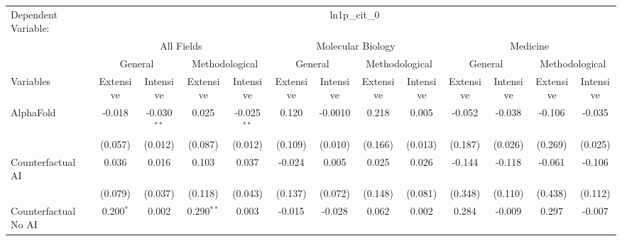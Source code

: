 \begingroup
\centering
\begin{tabular}{lcccccccccccc}
   \tabularnewline \midrule \midrule
   Dependent Variable: & \multicolumn{12}{c}{ln1p\_cit\_0}\\
 & \multicolumn{4}{c}{All Fields} & \multicolumn{4}{c}{Molecular Biology} & \multicolumn{4}{c}{Medicine} \\
\cmidrule(lr){2-5} \cmidrule(lr){6-9} \cmidrule(lr){10-13}
 & \multicolumn{2}{c}{General} & \multicolumn{2}{c}{Methodological} & \multicolumn{2}{c}{General} & \multicolumn{2}{c}{Methodological} & \multicolumn{2}{c}{General} & \multicolumn{2}{c}{Methodological} \\
\cmidrule(lr){2-3} \cmidrule(lr){4-5} \cmidrule(lr){6-7} \cmidrule(lr){8-9} \cmidrule(lr){10-11} \cmidrule(lr){12-13}
Variables & \multicolumn{1}{c}{Extensive} & \multicolumn{1}{c}{Intensive} & \multicolumn{1}{c}{Extensive} & \multicolumn{1}{c}{Intensive} & \multicolumn{1}{c}{Extensive} & \multicolumn{1}{c}{Intensive} & \multicolumn{1}{c}{Extensive} & \multicolumn{1}{c}{Intensive} & \multicolumn{1}{c}{Extensive} & \multicolumn{1}{c}{Intensive} & \multicolumn{1}{c}{Extensive} & \multicolumn{1}{c}{Intensive} \\
\cmidrule(lr){1-1}\cmidrule(lr){2-2} \cmidrule(lr){3-3} \cmidrule(lr){4-4} \cmidrule(lr){5-5} \cmidrule(lr){6-6} \cmidrule(lr){7-7} \cmidrule(lr){8-8} \cmidrule(lr){9-9} \cmidrule(lr){10-10} \cmidrule(lr){11-11} \cmidrule(lr){12-12} \cmidrule(lr){13-13}
   AlphaFold                                & -0.018       & -0.030$^{**}$ & 0.025        & -0.025$^{**}$ & 0.120   & -0.0010 & 0.218   & 0.005   & -0.052  & -0.038      & -0.106  & -0.035\\   
                                            & (0.057)      & (0.012)       & (0.087)      & (0.012)       & (0.109) & (0.010) & (0.166) & (0.013) & (0.187) & (0.026)     & (0.269) & (0.025)\\   
   Counterfactual AI                        & 0.036        & 0.016         & 0.103        & 0.037         & -0.024  & 0.005   & 0.025   & 0.026   & -0.144  & -0.118      & -0.061  & -0.106\\   
                                            & (0.079)      & (0.037)       & (0.118)      & (0.043)       & (0.137) & (0.072) & (0.148) & (0.081) & (0.348) & (0.110)     & (0.438) & (0.112)\\   
   Counterfactual No AI                     & 0.200$^{*}$  & 0.002         & 0.290$^{**}$ & 0.003         & -0.015  & -0.028  & 0.062   & 0.002   & 0.284   & -0.009      & 0.297   & -0.007\\   

\end{tabular}

